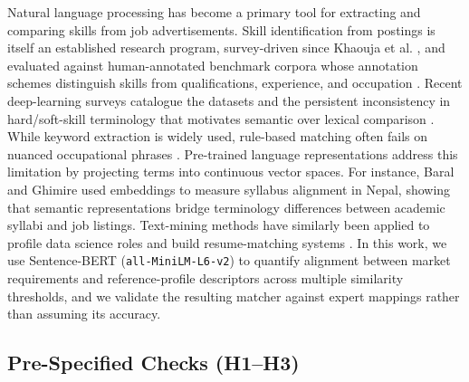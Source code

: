 \documentclass[journal]{IEEEtran}
\begin{document}
Natural language processing has become a primary tool for extracting and comparing skills from job advertisements. Skill identification from postings is itself an established research program, survey-driven since Khaouja et al. \cite{khaouja2021survey}, and evaluated against human-annotated benchmark corpora whose annotation schemes distinguish skills from qualifications, experience, and occupation \cite{green2022development, zhang2022skillspan}. Recent deep-learning surveys catalogue the datasets and the persistent inconsistency in hard/soft-skill terminology that motivates semantic over lexical comparison \cite{senger2024deep}. While keyword extraction is widely used, rule-based matching often fails on nuanced occupational phrases \cite{kruger2025improving}. Pre-trained language representations address this limitation by projecting terms into continuous vector spaces. For instance, Baral and Ghimire \cite{baral2026analyzing} used embeddings to measure syllabus alignment in Nepal, showing that semantic representations bridge terminology differences between academic syllabi and job listings. Text-mining methods have similarly been applied to profile data science roles \cite{mol2024unravelling, tee2024demand} and build resume-matching systems \cite{daberao2025resumeinsight}. In this work, we use Sentence-BERT (\texttt{all-MiniLM-L6-v2}) \cite{reimers2019sentence} to quantify alignment between market requirements and reference-profile descriptors across multiple similarity thresholds, and we validate the resulting matcher against expert mappings rather than assuming its accuracy.

\subsection{Pre-Specified Checks (H1--H3)}
\label{sec:hypotheses}
\end{document}
